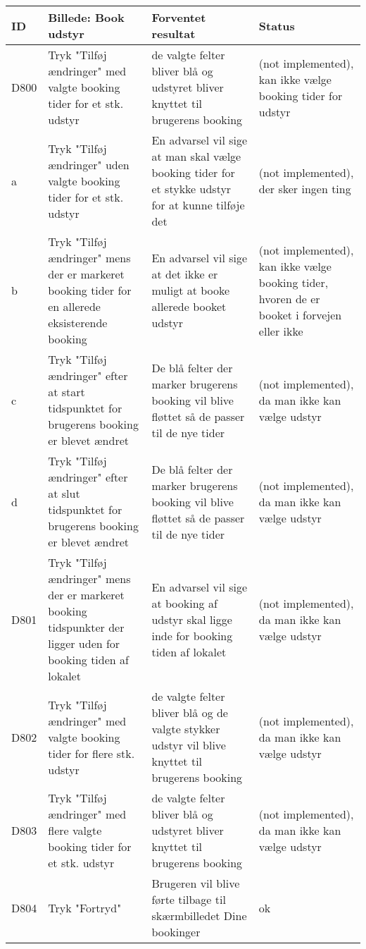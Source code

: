 \begin{tabularx}{\textwidth}{ |X|X|X|X| }
\hline
	ID & Billede: Book udstyr  & Forventet resultat & Status\\ 
\hline
	D800 & Tryk "Tilføj ændringer" med valgte booking tider for et stk. udstyr & de valgte felter bliver blå og udstyret bliver knyttet til brugerens booking &(not implemented), kan ikke vælge booking tider for udstyr \\
\hline
	a & Tryk "Tilføj ændringer" uden valgte booking tider for et stk. udstyr & En advarsel vil sige at man skal vælge booking tider for et stykke udstyr for at kunne tilføje det &(not implemented), der sker ingen ting \\
\hline
	b & Tryk "Tilføj ændringer" mens der er markeret booking tider for en allerede eksisterende booking & En advarsel vil sige at det ikke er muligt at booke allerede booket udstyr &(not implemented), kan ikke vælge booking tider, hvoren de er booket i forvejen eller ikke \\
\hline
	c & Tryk "Tilføj ændringer" efter at start tidspunktet for brugerens booking er blevet ændret & De blå felter der marker brugerens booking vil blive fløttet så de passer til de nye tider &(not implemented), da man ikke kan vælge udstyr  \\
\hline
	d & Tryk "Tilføj ændringer" efter at slut tidspunktet for brugerens booking er blevet ændret & De blå felter der marker brugerens booking vil blive fløttet så de passer til de nye tider & (not implemented), da man ikke kan vælge udstyr\\
\hline
	D801 & Tryk "Tilføj ændringer" mens der er markeret booking tidspunkter der ligger uden for booking tiden af lokalet & En advarsel vil sige at booking af udstyr skal ligge inde for booking tiden af lokalet & (not implemented), da man ikke kan vælge udstyr \\
\hline
	D802 & Tryk "Tilføj ændringer" med valgte booking tider for flere stk. udstyr & de valgte felter bliver blå og de valgte stykker udstyr vil blive knyttet til brugerens booking & (not implemented), da man ikke kan vælge udstyr \\
\hline
	D803 & Tryk "Tilføj ændringer" med flere valgte booking tider for et stk. udstyr & de valgte felter bliver blå og udstyret bliver knyttet til brugerens booking & (not implemented), da man ikke kan vælge udstyr\\
\hline
	D804 & Tryk "Fortryd" & Brugeren vil blive førte tilbage til skærmbilledet Dine bookinger & ok \\
\hline
\end{tabularx}

